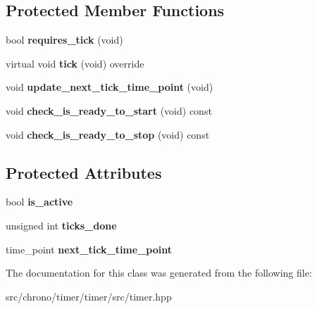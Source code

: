 \subsection*{Protected Member Functions}
\begin{DoxyCompactItemize}
\item 
\hypertarget{classxstd_1_1chrono_1_1timer_a79c070e4f1be92f8d8cf0cb62ebe0b2c}{bool {\bfseries requires\-\_\-tick} (void)}\label{classxstd_1_1chrono_1_1timer_a79c070e4f1be92f8d8cf0cb62ebe0b2c}

\item 
\hypertarget{classxstd_1_1chrono_1_1timer_a587e45f1e39ab87de14cda6f39e713da}{virtual void {\bfseries tick} (void) override}\label{classxstd_1_1chrono_1_1timer_a587e45f1e39ab87de14cda6f39e713da}

\item 
\hypertarget{classxstd_1_1chrono_1_1timer_aef7b4094eebf22027987e81993859488}{void {\bfseries update\-\_\-next\-\_\-tick\-\_\-time\-\_\-point} (void)}\label{classxstd_1_1chrono_1_1timer_aef7b4094eebf22027987e81993859488}

\item 
\hypertarget{classxstd_1_1chrono_1_1timer_a6088ae4c5a93946c1159122305d76535}{void {\bfseries check\-\_\-is\-\_\-ready\-\_\-to\-\_\-start} (void) const }\label{classxstd_1_1chrono_1_1timer_a6088ae4c5a93946c1159122305d76535}

\item 
\hypertarget{classxstd_1_1chrono_1_1timer_a631105f997839a66fb79c7ff87d83532}{void {\bfseries check\-\_\-is\-\_\-ready\-\_\-to\-\_\-stop} (void) const }\label{classxstd_1_1chrono_1_1timer_a631105f997839a66fb79c7ff87d83532}

\end{DoxyCompactItemize}
\subsection*{Protected Attributes}
\begin{DoxyCompactItemize}
\item 
\hypertarget{classxstd_1_1chrono_1_1timer_ac6a3c41d433b7e1387c297b925fb26d7}{bool {\bfseries is\-\_\-active}}\label{classxstd_1_1chrono_1_1timer_ac6a3c41d433b7e1387c297b925fb26d7}

\item 
\hypertarget{classxstd_1_1chrono_1_1timer_a40ec5c890d4e54669729744b634daa9e}{unsigned int {\bfseries ticks\-\_\-done}}\label{classxstd_1_1chrono_1_1timer_a40ec5c890d4e54669729744b634daa9e}

\item 
\hypertarget{classxstd_1_1chrono_1_1timer_a51e85ae6c2a43cef074e5ff3e03620f9}{time\-\_\-point {\bfseries next\-\_\-tick\-\_\-time\-\_\-point}}\label{classxstd_1_1chrono_1_1timer_a51e85ae6c2a43cef074e5ff3e03620f9}

\end{DoxyCompactItemize}


The documentation for this class was generated from the following file\-:\begin{DoxyCompactItemize}
\item 
src/chrono/timer/timer/src/timer.\-hpp\end{DoxyCompactItemize}
